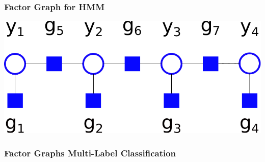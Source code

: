 \documentclass[final,ignorenonframetext,compress]{beamer}
\begin{document}
\begin{frame}
    \frametitle{Factor Graph for HMM}
    \begin{center}
        \includegraphics[width=.8\textwidth]{images/hmm_white_bg}
    \end{center}
\end{frame}

\begin{frame}
    \frametitle{Factor Graphs Multi-Label Classification}
    \begin{center}
    \end{center}
\end{frame}
\end{document}
